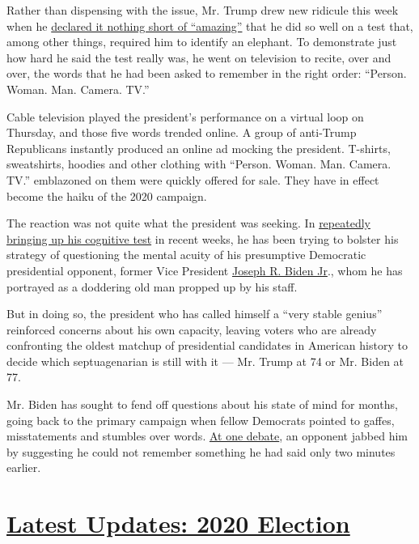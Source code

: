 Rather than dispensing with the issue, Mr. Trump drew new ridicule this
week when he
\href{https://www.nytimes.com/2020/07/22/us/politics/trump-cognitive-test-results.html}{declared
it nothing short of ``amazing''} that he did so well on a test that,
among other things, required him to identify an elephant. To demonstrate
just how hard he said the test really was, he went on television to
recite, over and over, the words that he had been asked to remember in
the right order: ``Person. Woman. Man. Camera. TV.''

Cable television played the president's performance on a virtual loop on
Thursday, and those five words trended online. A group of anti-Trump
Republicans instantly produced an online ad mocking the president.
T-shirts, sweatshirts, hoodies and other clothing with ``Person. Woman.
Man. Camera. TV.'' emblazoned on them were quickly offered for sale.
They have in effect become the haiku of the 2020 campaign.

The reaction was not quite what the president was seeking. In
\href{https://www.nytimes.com/2020/07/10/us/politics/trump-cognitive-test-health.html}{repeatedly
bringing up his cognitive test} in recent weeks, he has been trying to
bolster his strategy of questioning the mental acuity of his presumptive
Democratic presidential opponent, former Vice President
\href{https://www.nytimes.com/2020/07/24/business/joe-biden-stocks-taxes.html}{Joseph
R. Biden Jr}., whom he has portrayed as a doddering old man propped up
by his staff.

But in doing so, the president who has called himself a ``very stable
genius'' reinforced concerns about his own capacity, leaving voters who
are already confronting the oldest matchup of presidential candidates in
American history to decide which septuagenarian is still with it --- Mr.
Trump at 74 or Mr. Biden at 77.

Mr. Biden has sought to fend off questions about his state of mind for
months, going back to the primary campaign when fellow Democrats pointed
to gaffes, misstatements and stumbles over words.
\href{https://www.nytimes.com/2019/09/12/us/politics/castro-biden-memory-age-debate.html}{At
one debate}, an opponent jabbed him by suggesting he could not remember
something he had said only two minutes earlier.

\hypertarget{latest-updates-2020-election}{%
\section{\texorpdfstring{\href{https://www.nytimes.com/2020/08/03/us/elections/biden-vs-trump.html?action=click\&pgtype=Article\&state=default\&region=MAIN_CONTENT_1\&context=storylines_live_updates}{Latest
Updates: 2020
Election}}{Latest Updates: 2020 Election}}\label{latest-updates-2020-election}}

